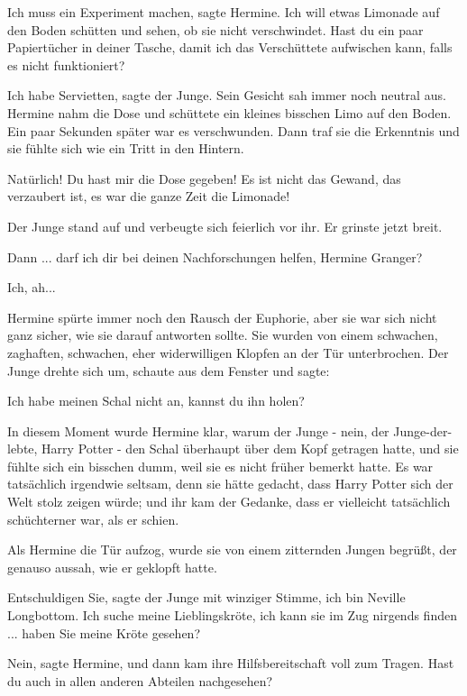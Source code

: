 \glqq Ich muss ein Experiment machen\grqq{}, sagte Hermine. \glqq Ich will etwas
Limonade auf den Boden schütten und sehen, ob sie nicht verschwindet. Hast du
ein paar Papiertücher in deiner Tasche, damit ich das Verschüttete aufwischen
kann, falls es nicht funktioniert?\grqq{}

\glqq Ich habe Servietten\grqq{}, sagte der Junge. Sein Gesicht sah immer noch
neutral aus. Hermine nahm die Dose und schüttete ein kleines bisschen Limo auf
den Boden. Ein paar Sekunden später war es verschwunden. Dann traf sie die
Erkenntnis und sie fühlte sich wie ein Tritt in den Hintern.

\glqq Natürlich! Du hast mir die Dose gegeben! Es ist nicht das Gewand, das
verzaubert ist, es war die ganze Zeit die Limonade!\grqq{}

Der Junge stand auf und verbeugte sich feierlich vor ihr. Er grinste jetzt
breit.

\glqq Dann ... darf ich dir bei deinen Nachforschungen helfen, Hermine
Granger?\grqq{}

\glqq Ich, ah...\grqq{}

Hermine spürte immer noch den Rausch der Euphorie, aber sie war sich nicht ganz
sicher, wie sie darauf antworten sollte. Sie wurden von einem schwachen,
zaghaften, schwachen, eher widerwilligen Klopfen an der Tür unterbrochen. Der
Junge drehte sich um, schaute aus dem Fenster und sagte:

\glqq Ich habe meinen Schal nicht an, kannst du ihn holen?\grqq{}

In diesem Moment wurde Hermine klar, warum der Junge - nein, der
Junge-der-lebte, Harry Potter - den Schal überhaupt über dem Kopf getragen
hatte, und sie fühlte sich ein bisschen dumm, weil sie es nicht früher bemerkt
hatte. Es war tatsächlich irgendwie seltsam, denn sie hätte gedacht, dass Harry
Potter sich der Welt stolz zeigen würde; und ihr kam der Gedanke, dass er
vielleicht tatsächlich schüchterner war, als er schien.

Als Hermine die Tür aufzog, wurde sie von einem zitternden Jungen begrüßt, der
genauso aussah, wie er geklopft hatte.

\glqq Entschuldigen Sie\grqq{}, sagte der Junge mit winziger Stimme, \glqq ich
bin Neville Longbottom. Ich suche meine Lieblingskröte, ich kann sie im Zug
nirgends finden ... haben Sie meine Kröte gesehen?\grqq{}

\glqq Nein\grqq{}, sagte Hermine, und dann kam ihre Hilfsbereitschaft voll zum
Tragen. \glqq Hast du auch in allen anderen Abteilen nachgesehen?\grqq{}

